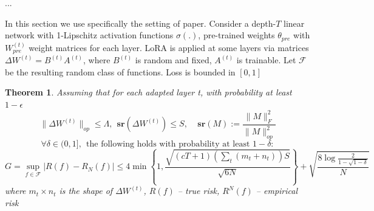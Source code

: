 \documentclass{article}
\newtheorem{theorem}{Theorem}
\begin{document}
            ... 

            In this section we use specifically the setting of \cite{kratsios2025sharpgeneralizationboundsfoundation} paper. Consider a depth-$T$ linear network with 1-Lipschitz activation functions $\sigma(.)$, pre-trained weights $\theta_{pre}$ with $W^{(t)}_{pre}$ weight matrices for each layer. LoRA is applied at some layers via matrices $\Delta W^{(t)} = B^{(t)}A^{(t)}$, where $B^{(t)}$ is random and fixed, $A^{(t)}$ is trainable. Let $\mathcal{F}$ be the resulting random class of functions. Loss is bounded in $[0,1]$
            \begin{theorem}
                Assuming that for each adapted layer t, with probability at least $1-\epsilon$
                $$\|\Delta W^{(t)}\|_{op} \leqslant \Lambda, ~~ \mathbf{sr}(\Delta W^{(t)})\leqslant S, ~~~~~ \mathbf{sr}(M) :=\frac{\|M\|_F^2}{\|M\|_{op}^2}$$
                $$\forall \delta \in (0, 1],~~ \text{the following holds with probability at least } 1-\delta:$$
                $$G = \sup\limits_{f\in\mathcal{F}}|R(f) - R_N(f)|\leqslant 4\min\left\{1, \frac{\sqrt{(cT + 1)(\sum_t(m_t + n_t))S}}{\sqrt{6N}} \right\} +\sqrt{\frac{8\log\frac{2}{1 - \sqrt{1 - \delta}}}{N}}$$
                where $m_t\times n_t$ is the shape of $\Delta W^{(t)}$, $R(f)$ -- true risk, $R^N(f)$ -- empirical risk
            \end{theorem}
\end{document}
